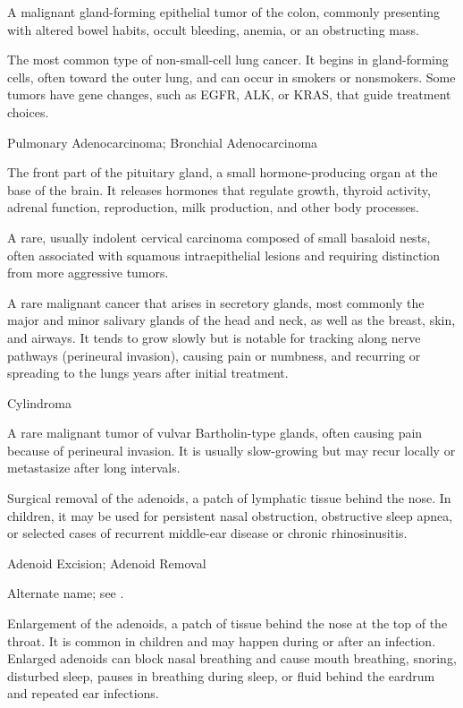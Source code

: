 A malignant gland-forming epithelial tumor of the colon, commonly presenting with
altered bowel habits, occult bleeding, anemia, or an obstructing mass.

 The most common type of non-small-cell lung cancer. It begins in gland-forming cells, often toward the outer lung, and can occur in smokers or nonsmokers. Some tumors have gene changes, such as EGFR, ALK, or KRAS, that guide treatment choices.

\synonyms
Pulmonary Adenocarcinoma; Bronchial Adenocarcinoma

 The front part of the pituitary gland, a small hormone-producing organ at the base of the brain. It releases hormones that regulate growth, thyroid activity, adrenal function, reproduction, milk production, and other body processes.

 A rare, usually indolent cervical carcinoma composed of small basaloid nests, often associated with squamous intraepithelial lesions and requiring distinction from more aggressive tumors.

 A rare malignant cancer that arises in secretory glands, most commonly the major and minor salivary glands of the head and neck, as well as the breast, skin, and airways. It tends to grow slowly but is notable for tracking along nerve pathways (perineural invasion), causing pain or numbness, and recurring or spreading to the lungs years after initial treatment.

\synonyms
Cylindroma

 A rare malignant tumor of vulvar Bartholin-type glands, often causing pain because of perineural invasion. It is usually slow-growing but may recur locally or metastasize after long intervals.

 Surgical removal of the adenoids, a patch of lymphatic tissue behind the nose. In children, it may be used for persistent nasal obstruction, obstructive sleep apnea, or selected cases of recurrent middle-ear disease or chronic rhinosinusitis.

\synonyms
Adenoid Excision; Adenoid Removal

 Alternate name; see .

 Enlargement of the adenoids, a patch of tissue behind the nose at the top of the throat.
It is common in children and may happen during or after an infection. Enlarged adenoids can block nasal breathing
and cause mouth breathing, snoring, disturbed sleep, pauses in breathing during sleep, or fluid behind the eardrum
and repeated ear infections.

